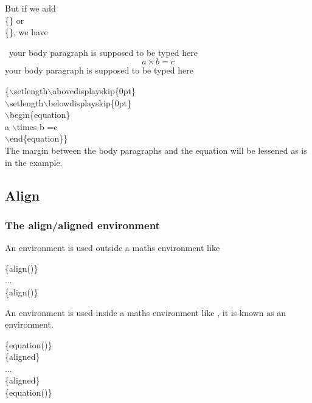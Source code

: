 \begin{frame}
	But if we add \\
	\{\} or\\
	\{\}, we have
    \begin{example}
		\ your body paragraph is supposed to be typed here
		{\setlength\abovedisplayskip{0pt}
        \setlength\belowdisplayskip{0pt}
        \begin{equation}
         a \times b =c
        \end{equation}}
		your body paragraph is supposed to be typed here
	\end{example}
    {\color{blue}\{$\backslash$setlength$\backslash$abovedisplayskip\{0pt\}
        \\$\backslash$setlength$\backslash$belowdisplayskip\{0pt\}
       \\ $\backslash$begin\{equation\}
         \\a $\backslash$times b =c
        \\$\backslash$end\{equation\}\}}
    \\[0.5em]The margin between the body paragraphs and the equation will be lessened 
    as is in the example.
\end{frame}

\subsection{Align}

\begin{frame}
	\frametitle{The align/aligned environment}
	An  environment is used outside a maths environment like 
	\begin{command}
		\{align(\structure{*})\}\\
		\qquad ...\\
		\{align(\structure{*})\}\\
	\end{command}
	An  environment is used inside a maths environment like , it is known as an  environment.
	\begin{command}
		\{equation(\structure{*})\}\\
		\qquad{}\{aligned\}\\
		\qquad\qquad ...\\
		\qquad{}\{aligned\}\\
		\{equation(\structure{*})\}\\
	\end{command}
\end{frame}

